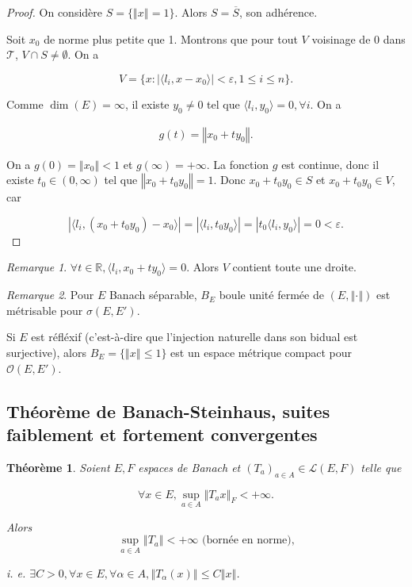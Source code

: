 \documentclass[french]{book}
\newtheorem{prototheorem}{Théorème}[section]
\newenvironment{thm}
   {\colorlet{shadecolor}{orange!10}\begin{shaded}\begin{prototheorem}}
   {\end{prototheorem}\end{shaded}}
\theoremstyle{definition}
\theoremstyle{remark}
\newtheorem*{remark}{Remarque}
\newcommand{\lesss}{<}
\newcommand{\less}{\lesss}
\newcommand{\biggg}{>}
\newcommand{\bg}{\biggg}
\begin{document}
\begin{proof}
  On considère \(S = \{ \left\Vert x \right\Vert =1 \}\). Alors \(S = \overline{S}\), son adhérence.

  Soit \(x_0\) de norme plus petite que 1. Montrons que pour tout \(V\) voisinage de 0 dans \(\mathscr{T}\), \(V \cap S \neq \emptyset\). On a

  \[V = \{ x : \left\lvert \langle l_i,x - x_0 \rangle  \right\rvert \less \varepsilon, 1 \leq i \leq n \}.\]

  Comme \(\operatorname{dim}(E) = \infty\), il existe \(y_0 \neq 0\) tel que \(\langle l_i, y_0 \rangle =0, \forall i\). On a

  \begin{gather*}
    g(t) = \left\Vert x_0 + t y_0 \right\Vert.
  \end{gather*}

  On a \(g(0) = \left\Vert x_0 \right\Vert \less 1\) et \(g(\infty) = +\infty\). La fonction \(g\) est continue, donc il existe \(t_0 \in (0, \infty)\) tel que \(\left\Vert x_0 + t_0 y_0 \right\Vert = 1\). Donc \(x_0 + t_0 y_0 \in S\) et \(x_0 + t_0 y_0 \in V\), car

  \[\left\lvert \langle l_i, (x_0 + t_0 y_0) - x_0 \rangle  \right\rvert = \left\lvert \langle l_i, t_0 y_0 \rangle  \right\rvert = \left\lvert t_0 \langle l_i, y_0 \rangle  \right\rvert = 0 \less \varepsilon.\]
\end{proof}

\begin{remark}
  \(\forall t \in \mathbb{R}, \langle l_i, x_0 + t y_0 \rangle = 0\). Alors \(V\) contient toute une droite.
\end{remark}

\begin{remark}
  Pour \(E\) Banach séparable, \(B_E\) boule unité fermée de \((E,\left\Vert \cdot \right\Vert)\) est métrisable pour \(\sigma(E,E')\).

  Si \(E\) est réfléxif (c'est-à-dire que l'injection naturelle dans son bidual est surjective), alors \(B_E = \{ \left\Vert x \right\Vert \leq 1 \} \) est un espace métrique compact pour \(\mathcal{O}(E, E')\).
\end{remark}

\subsection{Théorème de Banach-Steinhaus, suites faiblement et fortement convergentes}

\begin{thm}
  Soient \(E,F\) espaces de Banach et \((T_a) _{a \in A} \in \mathscr{L}(E,F)\) telle que

  \[\forall x \in E, \sup_{ a \in A } \left\Vert T_a x \right\Vert _{F} \less + \infty.\]

  Alors \[\sup_{ a \in A } \left\Vert T_a \right\Vert \less +\infty \text{ (bornée en norme),}\]

  i. e. \(\exists C \bg 0, \forall x \in E, \forall \alpha \in A, \left\Vert T_\alpha(x)\right\Vert \leq C \left\Vert x \right\Vert\).
\end{thm}
\end{document}
